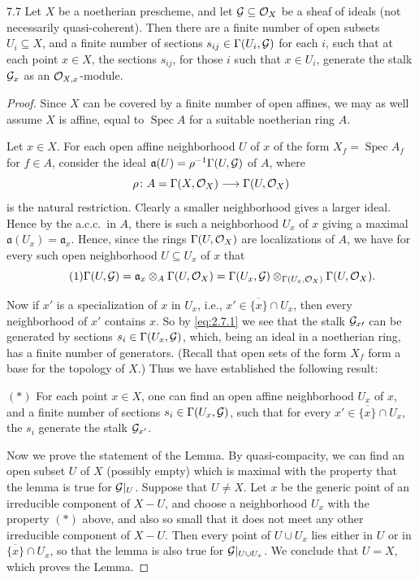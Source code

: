 \begin{booklemma}{7.7}\label{lem:2.7.7}
Let $X$ be a noetherian prescheme, and let $\mathcal{G}\subseteq\mathcal{O}_X$ be a sheaf of ideals (not necessarily quasi-coherent). Then there are a finite number of open subsets $U_i\subseteq X$, and a finite number of sections $s_{ij}\in\Gamma(U_i,\mathcal{G})$ for each $i$, such that at each point $x\in X$, the sections $s_{ij}$, for those $i$ such that $x\in U_i$, generate the stalk $\mathcal{G}_x$ as an $\mathcal{O}_{X,x}$-module.
\end{booklemma}

\begin{proof}
Since $X$ can be covered by a finite number of open affines, we may as well assume $X$ is affine, equal to $\operatorname{Spec}A$ for a suitable noetherian ring $A$.

Let $x\in X$. For each open affine neighborhood $U$ of $x$ of the form $X_f=\operatorname{Spec}A_f$ for $f\in A$, consider the ideal $\mathfrak{a}(U)=\rho^{-1}\Gamma(U,\mathcal{G})$ of $A$, where
\[
\rho\colon A = \Gamma(X,\mathcal{O}_X) \longrightarrow \Gamma(U,\mathcal{O}_X)
\]
is the natural restriction. Clearly a smaller neighborhood gives a larger ideal. Hence by the a.c.c.\ in $A$, there is such a neighborhood $U_x$ of $x$ giving a maximal $\mathfrak{a}(U_x)=\mathfrak{a}_x$. Hence, since the rings $\Gamma(U,\mathcal{O}_X)$ are localizations of $A$, we have for every such open neighborhood $U\subseteq U_x$ of $x$ that
\begin{equation}\tag{1}\label{eq:2.7.1}
\Gamma(U,\mathcal{G}) = \mathfrak{a}_x \otimes_A \Gamma(U,\mathcal{O}_X) = \Gamma(U_x,\mathcal{G}) \otimes_{\Gamma(U_x,\mathcal{O}_X)} \Gamma(U,\mathcal{O}_X).
\end{equation}

Now if $x'$ is a specialization of $x$ in $U_x$, i.e., $x'\in\overline{\{x\}}\cap U_x$, then every neighborhood of $x'$ contains $x$. So by \eqref{eq:2.7.1} we see that the stalk $\mathcal{G}_{x\prime}$ can be generated by sections $s_i\in\Gamma(U_x,\mathcal{G})$, which, being an ideal in a noetherian ring, has a finite number of generators. (Recall that open sets of the form $X_f$ form a base for the topology of $X$.) Thus we have established the following result:

$(*)$ For each point $x\in X$, one can find an open affine neighborhood $U_x$ of $x$, and a finite number of sections $s_i\in\Gamma(U_x,\mathcal{G})$, such that for every $x'\in\overline{\{x\}}\cap U_x$, the $s_i$ generate the stalk $\mathcal{G}_{x'}$.

Now we prove the statement of the Lemma. By quasi-compacity, we can find an open subset $U$ of $X$ (possibly empty) which is maximal with the property that the lemma is true for $\mathcal{G}|_U$. Suppose that $U\neq X$. Let $x$ be the generic point of an irreducible component of $X-U$, and choose a neighborhood $U_x$ with the property $(*)$ above, and also so small that it does not meet any other irreducible component of $X-U$. Then every point of $U\cup U_x$ lies either in $U$ or in $\overline{\{x\}}\cap U_x$, so that the lemma is also true for $\mathcal{G}|_{U\cup U_x}$. We conclude that $U=X$, which proves the Lemma.
\end{proof}

